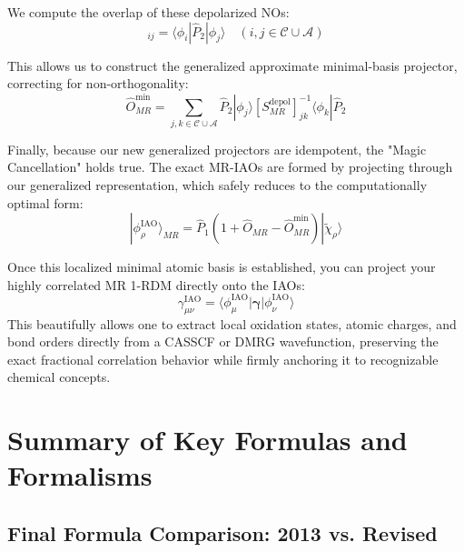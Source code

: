 \documentclass[11pt]{article}
\newcommand{\mnote}[1]{\marginpar{\linespread{1.1}\footnotesize\textsf{\textcolor{blue}{\textbf{Margin Note:} #1}}}}
\begin{document}
We compute the overlap of these depolarized NOs:
\begin{equation}
    [S_{MR}^{\text{depol}}]_{ij} = \langle\phi_i | \hat{P}_2 | \phi_j\rangle \quad (i,j \in \mathcal{C} \cup \mathcal{A})
\end{equation}


This allows us to construct the generalized approximate minimal-basis projector, correcting for non-orthogonality:
\begin{equation}
    \hat{O}_{MR}^{\text{min}} = \sum_{j,k \in \mathcal{C} \cup \mathcal{A}} \hat{P}_2 |\phi_j\rangle [S_{MR}^{\text{depol}}]^{-1}_{jk} \langle\phi_k| \hat{P}_2
\end{equation}

Finally, because our new generalized projectors are idempotent, the "Magic Cancellation" holds true. The exact MR-IAOs are formed by projecting through our generalized representation, which safely reduces to the computationally optimal form:
\begin{equation}
    |\phi_\rho^{\text{IAO}}\rangle_{MR} = \hat{P}_1 (1 + \hat{O}_{MR} - \hat{O}_{MR}^{\text{min}}) |\tilde{\chi}_\rho\rangle
\end{equation}

Once this localized minimal atomic basis is established, you can project your highly correlated MR 1-RDM directly onto the IAOs:
\begin{equation}
    \gamma_{\mu\nu}^{\text{IAO}} = \langle \phi_\mu^{\text{IAO}} | \boldsymbol{\gamma} | \phi_\nu^{\text{IAO}} \rangle
\end{equation}
This beautifully allows one to extract local oxidation states, atomic charges, and bond orders directly from a CASSCF or DMRG wavefunction, preserving the exact fractional correlation behavior while firmly anchoring it to recognizable chemical concepts.

\vspace{0.5cm}

\section{Summary of Key Formulas and Formalisms}

\subsection{Final Formula Comparison: 2013 vs. Revised}
\end{document}
